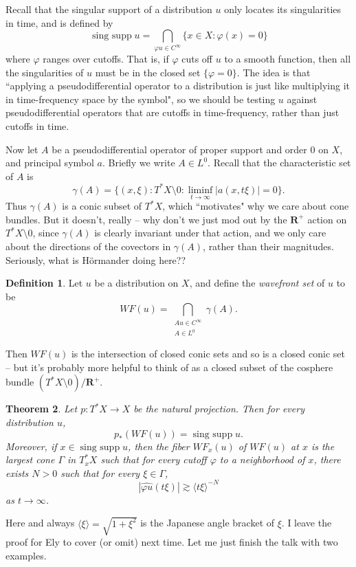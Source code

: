 \documentclass[reqno,12pt,letterpaper]{amsart}
\newcommand{\RR}{\mathbf{R}}
\DeclareMathOperator{\singsupp}{sing~supp}
\newcommand{\dfn}[1]{\emph{#1}\index{#1}}
\newtheorem{theorem}{Theorem}[section]
\theoremstyle{definition}
\newtheorem{definition}[theorem]{Definition}
\begin{document}
Recall that the singular support of a distribution $u$ only locates its singularities in time, and is defined by
$$\singsupp u = \bigcap_{\varphi u \in C^\infty} \{x \in X: \varphi(x) = 0\}$$
where $\varphi$ ranges over cutoffs.
That is, if $\varphi$ cuts off $u$ to a smooth function, then all the singularities of $u$ must be in the closed set $\{\varphi = 0\}$.
The idea is that ``applying a pseudodifferential operator to a distribution is just like multiplying it in time-frequency space by the symbol", so we should be testing $u$ against pseudodifferential operators that are cutoffs in time-frequency, rather than just cutoffs in time.

Now let $A$ be a pseudodifferential operator of proper support and order $0$ on $X$, and principal symbol $a$.
Briefly we write $A \in L^0$.
Recall that the characteristic set of $A$ is
$$\gamma(A) = \{(x, \xi): T^*X \setminus 0: \liminf_{t \to \infty} |a(x, t\xi)| = 0\}.$$
Thus $\gamma(A)$ is a conic subset of $T^*X$, which ``motivates" why we care about cone bundles.
But it doesn't, really -- why don't we just mod out by the $\RR^+$ action on $T^*X \setminus 0$, since $\gamma(A)$ is clearly invariant under that action, and we only care about the directions of the covectors in $\gamma(A)$, rather than their magnitudes.
Seriously, what is H\"ormander doing here??

\begin{definition}
Let $u$ be a distribution on $X$, and define the \dfn{wavefront set} of $u$ to be
$$WF(u) = \bigcap_{\substack{Au \in C^\infty\\A \in L^0}} \gamma(A).$$
\end{definition}

Then $WF(u)$ is the intersection of closed conic sets and so is a closed conic set -- but it's probably more helpful to think of as a closed subset of the cosphere bundle $(T^*X \setminus 0)/\RR^+$.

\begin{theorem}
Let $p: T^*X \to X$ be the natural projection. Then for every distribution $u$,
$$p_*(WF(u)) = \singsupp u.$$
Moreover, if $x \in \singsupp u$, then the fiber $WF_x(u)$ of $WF(u)$ at $x$ is the largest cone $\Gamma$ in $T^*_xX$ such that for every cutoff $\varphi$ to a neighborhood of $x$, there exists $N > 0$ such that for every $\xi \in \Gamma$,
$$|\widehat{\varphi u}(t\xi)| \gtrsim \langle t\xi\rangle^{-N}$$
as $t \to \infty$.
\end{theorem}

Here and always $\langle \xi \rangle = \sqrt{1 + \xi^2}$ is the Japanese angle bracket of $\xi$.
I leave the proof for Ely to cover (or omit) next time. Let me just finish the talk with two examples.
\end{document}
